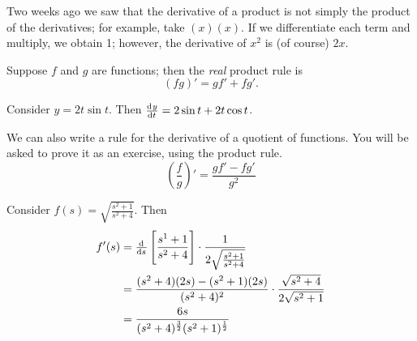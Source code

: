 


Two weeks ago we saw that the derivative of a product is not simply the product of the derivatives;
for example, take $ (x)(x) $. If we differentiate each term and multiply, we obtain 1; however,
the derivative of $ x^2 $ is (of course) $ 2x $.

Suppose $ f $ and $ g $ are functions; then the \textit{real} product rule is
\begin{displaymath}
  (fg)' = gf' + fg'.
\end{displaymath}

\begin{ex}
  Consider $ y = 2t \sin t $. Then $ \od{y}{t} = 2 \sin t + 2t \cos t $.
\end{ex}

We can also write a rule for the derivative of a quotient of functions. You will be asked to
prove it as an exercise, using the product rule.
\begin{displaymath}
  \left( \frac{f}{g} \right)' = \frac{gf' - fg'}{g^2}
\end{displaymath}

\begin{ex}
  Consider $ f(s) = \sqrt{\frac{s^2 + 1}{s^2 + 4}} $. Then
  \begin{align*}
    f'(s) &= \od{}{s} \left[ \frac{s^1 + 1}{s^2 + 4} \right] \cdot \frac{1}{2\sqrt{\frac{s^2 + 1}{s^2 + 4}}}\\
          &= \frac{(s^2 + 4)(2s) - (s^2 + 1)(2s)}{(s^2 + 4)^2} \cdot \frac{\sqrt{s^2 + 4}}{2\sqrt{s^2 + 1}}\\
          &= \frac{6s}{(s^2 + 4)^{\frac{3}{2}} (s^2 + 1)^{\frac{1}{2}}}
  \end{align*}
\end{ex}

\clearpage
